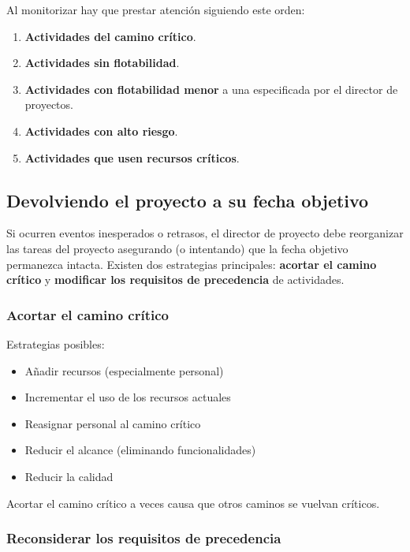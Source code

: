 \documentclass[12pt]{article}
\begin{document}
{Al monitorizar hay que prestar atención siguiendo este orden:}

\begin{enumerate}
    \item {\textbf{Actividades del camino crítico}.}
    \item {\textbf{Actividades sin flotabilidad}.}
    \item {\textbf{Actividades con flotabilidad menor} a una especificada por el director de proyectos.}
    \item {\textbf{Actividades con alto riesgo}.}
    \item {\textbf{Actividades que usen recursos críticos}.}
\end{enumerate}

\subsection{Devolviendo el proyecto a su fecha objetivo}
\label{9.8.0}

{Si ocurren eventos inesperados o retrasos, el director de proyecto debe reorganizar las tareas del proyecto asegurando (o intentando) que la fecha objetivo permanezca intacta. Existen dos estrategias principales: \textbf{acortar el camino crítico} y \textbf{modificar los requisitos de precedencia} de actividades.}

\subsubsection{Acortar el camino crítico}
\label{9.8.1}

{Estrategias posibles:}

\begin{itemize}
    \item {Añadir recursos (especialmente personal)}
    \item {Incrementar el uso de los recursos actuales}
    \item {Reasignar personal al camino crítico}
    \item {Reducir el alcance (eliminando funcionalidades)}
    \item {Reducir la calidad}
\end{itemize}

{Acortar el camino crítico a veces causa que otros caminos se vuelvan críticos.}

\subsubsection{Reconsiderar los requisitos de precedencia}
\label{9.8.2}
\end{document}
